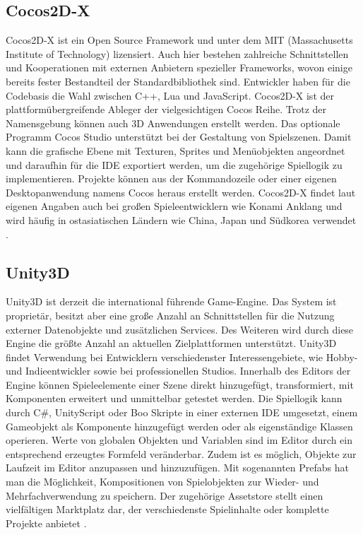 \subsection{Cocos2D-X}
Cocos2D-X ist ein Open Source Framework und unter dem MIT (Massachusetts Institute of Technology) lizensiert. Auch hier bestehen zahlreiche Schnittstellen und Kooperationen mit externen Anbietern spezieller Frameworks, wovon einige bereits fester Bestandteil der Standardbibliothek sind. Entwickler haben für die Codebasis die Wahl zwischen C++, Lua und JavaScript. Cocos2D-X ist der plattformübergreifende Ableger der vielgesichtigen Cocos Reihe. Trotz der Namensgebung können auch 3D Anwendungen erstellt werden. Das optionale Programm Cocos Studio unterstützt bei der Gestaltung von Spielszenen. Damit kann die grafische Ebene mit Texturen, Sprites und Menüobjekten angeordnet und daraufhin für die IDE exportiert werden, um die zugehörige Spiellogik zu implementieren. Projekte können aus der Kommandozeile oder einer eigenen Desktopanwendung namens Cocos heraus erstellt werden. Cocos2D-X findet laut eigenen Angaben auch bei großen Spieleentwicklern wie Konami Anklang und wird häufig in ostasiatischen Ländern wie China, Japan und Südkorea verwendet \citep{cocos2d_main_features}. 


\subsection{Unity3D}
Unity3D ist derzeit die international führende Game-Engine. Das System ist proprietär, besitzt aber eine große Anzahl an Schnittstellen für die Nutzung externer Datenobjekte und zusätzlichen Services. Des Weiteren wird durch diese Engine die größte Anzahl an aktuellen Zielplattformen unterstützt. Unity3D findet Verwendung bei Entwicklern verschiedenster Interessengebiete, wie Hobby- und Indieentwickler sowie bei professionellen Studios. Innerhalb des Editors der Engine können Spieleelemente einer Szene direkt hinzugefügt, transformiert, mit Komponenten erweitert und unmittelbar getestet werden. Die Spiellogik kann durch C\#, UnityScript oder Boo Skripte in einer externen IDE umgesetzt, einem Gameobjekt als Komponente hinzugefügt werden oder als eigenständige Klassen operieren. Werte von globalen Objekten und Variablen sind im Editor durch ein entsprechend erzeugtes Formfeld veränderbar. Zudem ist es möglich, Objekte zur Laufzeit im Editor anzupassen und hinzuzufügen. Mit sogenannten Prefabs hat man die Möglichkeit, Kompositionen von Spielobjekten zur Wieder- und Mehrfachverwendung zu speichern. Der zugehörige Assetstore stellt einen vielfältigen Marktplatz dar, der verschiedenste Spielinhalte oder komplette Projekte anbietet \citep{unity_public_relations}. 


